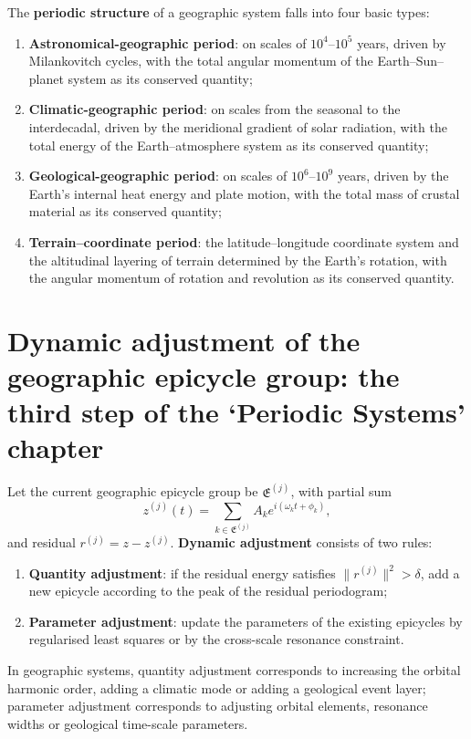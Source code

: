 \begin{definition}\label{def:geographic_periodic_structure}
The \textbf{periodic structure} of a geographic system falls into four basic types:
\begin{enumerate}[label=(\roman*)]
    \item \textbf{Astronomical-geographic period}: on scales of $10^4$--$10^5$ years, driven by Milankovitch cycles, with the total angular momentum of the Earth--Sun--planet system as its conserved quantity;
    \item \textbf{Climatic-geographic period}: on scales from the seasonal to the interdecadal, driven by the meridional gradient of solar radiation, with the total energy of the Earth--atmosphere system as its conserved quantity;
    \item \textbf{Geological-geographic period}: on scales of $10^6$--$10^9$ years, driven by the Earth's internal heat energy and plate motion, with the total mass of crustal material as its conserved quantity;
    \item \textbf{Terrain--coordinate period}: the latitude--longitude coordinate system and the altitudinal layering of terrain determined by the Earth's rotation, with the angular momentum of rotation and revolution as its conserved quantity.
\end{enumerate}
\end{definition}

\section{Dynamic adjustment of the geographic epicycle group: the third step of the `Periodic Systems' chapter}
\label{sec:geo_adaptive}

\begin{definition}\label{def:geo_adaptive_adjustment}
Let the current geographic epicycle group be $\mathfrak E^{(j)}$, with partial sum
\[
z^{(j)}(t)=\sum_{k\in\mathfrak E^{(j)}}A_k e^{i(\omega_k t+\phi_k)},
\]
and residual $r^{(j)}=z-z^{(j)}$. \textbf{Dynamic adjustment} consists of two rules:
\begin{enumerate}[label=(\roman*)]
    \item \textbf{Quantity adjustment}: if the residual energy satisfies $\|r^{(j)}\|^2>\delta$, add a new epicycle according to the peak of the residual periodogram;
    \item \textbf{Parameter adjustment}: update the parameters of the existing epicycles by regularised least squares or by the cross-scale resonance constraint.
\end{enumerate}
In geographic systems, quantity adjustment corresponds to increasing the orbital harmonic order, adding a climatic mode or adding a geological event layer; parameter adjustment corresponds to adjusting orbital elements, resonance widths or geological time-scale parameters.
\end{definition}

